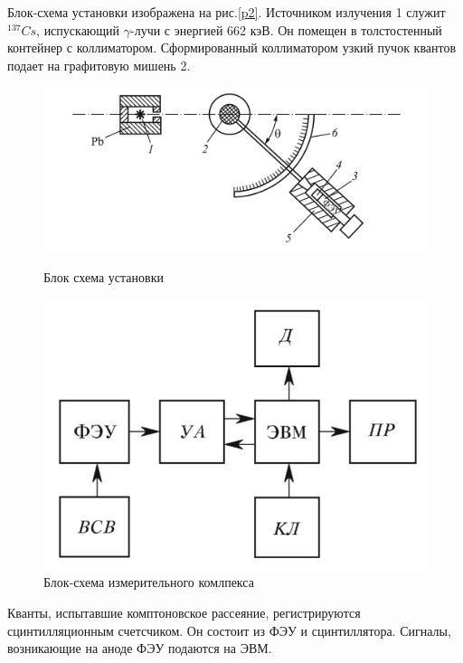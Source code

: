 \documentclass[a4paper]{article}
\begin{document}
Блок-схема установки изображена на рис.\ref{p2}. Источником излучения 1 служит $^{137}Cs$, испускающий $\gamma$-лучи с энергией 
662 кэВ. Он помещен в толстостенный контейнер с коллиматором. Сформированный коллиматором узкий пучок квантов подает на графитовую 
мишень 2.

\begin{figure}[h]
	\begin{center}
	\begin{minipage}[h]{0.5\linewidth}
	\includegraphics[width=1\linewidth]{p2.png}
	\caption{Блок схема установки} %
	\label{p2} %
	\end{minipage}
	\hfill 
	\begin{minipage}[h]{0.3\linewidth}
	\includegraphics[width=1\linewidth]{p3.png}
	\caption{Блок-схема измерительного комлпекса}
	\label{p3}
	\end{minipage}
	\end{center}
\end{figure}

Кванты, испытавшие комптоновское рассеяние, регистрируются сцинтилляционным счетсчиком.
Он состоит из ФЭУ и сцинтиллятора. Сигналы, возникающие на аноде ФЭУ подаются на ЭВМ.
\end{document}
